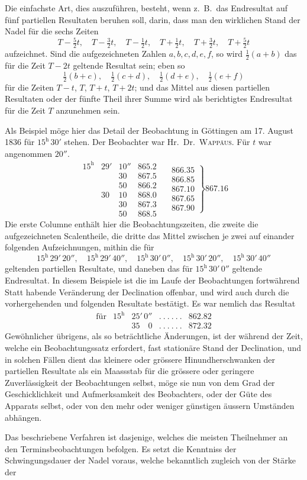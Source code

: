 Die einfachste Art, dies auszuführen, besteht, wenn z.\ B.\ das Endresultat auf fünf partiellen Resultaten beruhen soll, darin, dass man den wirklichen Stand der Nadel für die sechs Zeiten
\[
T-\tfrac52t,\quad T-\tfrac32t,\quad T-\tfrac12t,\quad T+\tfrac12t,\quad T+\tfrac32t,\quad T+\tfrac52t
\]
aufzeichnet. Sind die aufgezeichneten Zahlen $a,b,c,d,e,f$, so wird $\tfrac12(a+b)$ das für die Zeit $T-2t$ geltende Resultat sein; eben so
\[
\tfrac12(b+c),\quad\tfrac12(c+d),\quad\tfrac12(d+e),\quad\tfrac12(e+f)
\]
für die Zeiten $T-t$, $T$, $T+t$, $T+2t$; und das Mittel aus diesen partiellen
Resultaten oder der fünfte Theil ihrer Summe wird als berichtigtes Endresultat für die Zeit $T$ anzunehmen sein.

Als Beispiel möge hier das Detail der Beobachtung in Göttingen am 17. August 1836 für $15^{\mathrm h}\,30'$ stehen. Der Beobachter war Hr.\ Dr.\ \textsc{Wappäus}. Für $t$ war angenommen $20''$.
\[
\begin{array}{rrr|r|}
15^{\mathrm h}&29'&10''&865.2\\
&&30&867.5\\
&&50&866.2\\
&30&10&868.0\\
&&30&867.3\\
&&50&868.5
\end{array}
\quad
\left.\begin{array}{r}866.35\\866.85\\867.10\\867.65\\867.90\end{array}\right\}867.16
\]
Die erste Columne enthält hier die Beobachtungszeiten, die zweite die aufgezeichneten Scalentheile, die dritte das Mittel zwischen je zwei auf einander folgenden Aufzeichnungen, mithin die für
\[
15^{\mathrm h}\,29'\,20'',\quad15^{\mathrm h}\,29'\,40'',\quad15^{\mathrm h}\,30'\,0'',\quad15^{\mathrm h}\,30'\,20'',\quad15^{\mathrm h}\,30'\,40''
\]
geltenden partiellen Resultate, und daneben das für $15^{\mathrm h}\,30'\,0''$ geltende Endresultat. In diesem Beispiele ist die im Laufe der Beobachtungen fortwährend Statt habende Veränderung der Declination offenbar, und wird auch durch die vorhergehenden und folgenden Resultate bestätigt. Es war nemlich das Resultat
\[
\begin{array}{lrrll}
\text{für}&15^{\mathrm h}&25'\,0''&.\ .\ .\ .\ .\ .&862.82\\
&&35\quad0&.\ .\ .\ .\ .\ .&872.32
\end{array}
\]
Gewöhnlicher übrigens, als so beträchtliche Änderungen, ist der während der Zeit, welche ein Beobachtungssatz erfordert, fast stationäre Stand der Declination, und in solchen Fällen dient das kleinere oder grössere Hinundherschwanken der partiellen Resultate als ein Maassstab für die grössere oder geringere Zuverlässigkeit der Beobachtungen selbst, möge sie nun von dem Grad der Geschicklichkeit und Aufmerksamkeit des Beobachters, oder der Güte des Apparats selbst, oder von den mehr oder weniger günstigen äussern Umständen abhängen.

Das beschriebene Verfahren ist dasjenige, welches die meisten Theilnehmer an den Terminsbeobachtungen befolgen. Es setzt die Kenntniss der Schwingungsdauer der Nadel voraus, welche bekanntlich zugleich von der Stärke der
